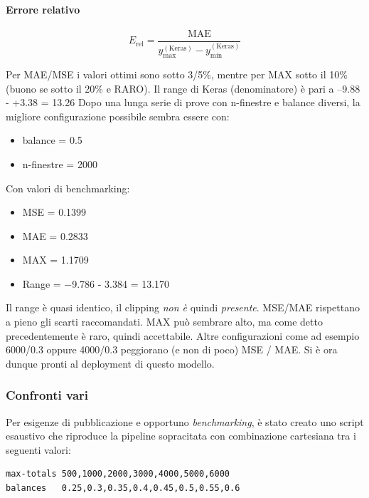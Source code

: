 \paragraph{Errore relativo}
\begin{equation}
E_{\mathrm{rel}} = \frac{\mathrm{MAE}}{y_{\max}^{(\mathrm{Keras})} - y_{\min}^{(\mathrm{Keras})}}
\end{equation}

Per MAE/MSE i valori ottimi sono sotto 3/5\%, mentre per MAX sotto il 10\% (buono se sotto il 20\% e RARO). Il range di Keras (denominatore) è pari a –9.88 - +3.38 = 13.26
Dopo una lunga serie di prove con n-finestre e balance diversi, la migliore configurazione possibile sembra essere con:

\begin{itemize}
    \item balance = 0.5
    \item n-finestre = 2000
\end{itemize}

Con valori di benchmarking:

\begin{itemize}
    \item MSE = 0.1399
    \item MAE = 0.2833
    \item MAX = 1.1709
    \item Range = −9.786 - 3.384 = 13.170
\end{itemize}

Il range è quasi identico, il clipping \textit{non è} quindi \textit{presente}. MSE/MAE rispettano a pieno gli scarti raccomandati. MAX può sembrare alto, ma come detto precedentemente è raro, quindi accettabile. Altre configurazioni come ad esempio 6000/0.3 oppure 4000/0.3 peggiorano (e non di poco) MSE / MAE.
Si è ora dunque pronti al deployment di questo modello.

\subsubsection{Confronti vari}
Per esigenze di pubblicazione e opportuno \textit{benchmarking}, è stato creato uno script esaustivo che riproduce la pipeline sopracitata con combinazione cartesiana tra i seguenti valori:

\begin{verbatim}
max-totals 500,1000,2000,3000,4000,5000,6000
balances   0.25,0.3,0.35,0.4,0.45,0.5,0.55,0.6
\end{verbatim}

